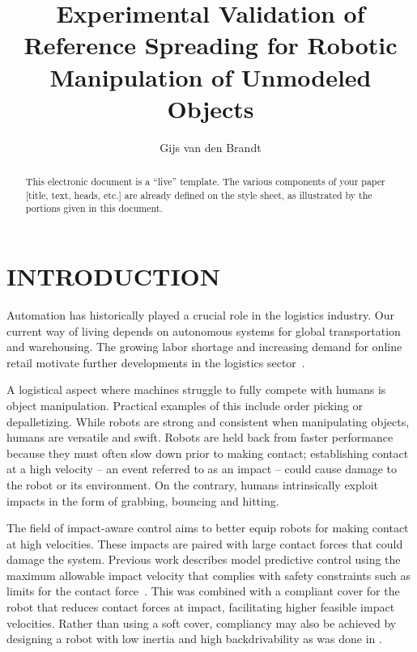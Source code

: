 \documentclass[a4paper, 10pt, conference]{ieeeconf}
\title{\LARGE \bf
    Experimental Validation of Reference Spreading for Robotic Manipulation of Unmodeled Objects
    }
\author{Gijs van den Brandt%
    }
\begin{document}
    \maketitle
    \thispagestyle{empty}
    \pagestyle{empty}

    \begin{abstract}

    This electronic document is a ``live'' template. The various components of your paper [title, text, heads, etc.] are already defined on the style sheet, as illustrated by the portions given in this document.

    \end{abstract}

    \section{INTRODUCTION}

    Automation has historically played a crucial role in the logistics industry. Our current way of living depends on autonomous systems for global transportation and warehousing. The growing labor shortage and increasing demand for online retail motivate further developments in the logistics sector~\cite{dekhneAutomationLogisticsBig2019}.

    A logistical aspect where machines struggle to fully compete with humans is object manipulation. Practical examples of this include order picking or depalletizing. While robots are strong and consistent when manipulating objects, humans are versatile and swift. Robots are held back from faster performance because they must often slow down prior to making contact; establishing contact at a high velocity -- an event referred to as an impact -- could cause damage to the robot or its environment. On the contrary, humans intrinsically exploit impacts in the form of grabbing, bouncing and hitting.

    The field of impact-aware control aims to better equip robots for making contact at high velocities. These impacts are paired with large contact forces that could damage the system. Previous work describes model predictive control using the maximum allowable impact velocity that complies with safety constraints such as limits for the contact force~\cite{dehioRobotSafeImpactsSoft2021, dehioDualArmBoxGrabbing2022}. This was combined with a compliant cover for the robot that reduces contact forces at impact, facilitating higher feasible impact velocities. Rather than using a soft cover, compliancy may also be achieved by designing a robot with low inertia and high backdrivability as was done in \cite{songDevelopmentLowInertiaHighStiffness2018}.
\end{document}
